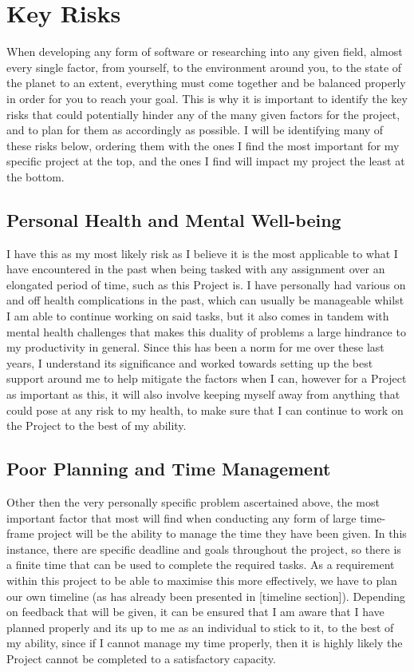 \documentclass{article}
\begin{document}
\section{Key Risks}
When developing any form of software or researching into any given field, almost every single factor, from yourself, to the environment around you, to the state of the planet to an extent, everything must come together and be balanced properly in order for you to reach your goal. This is why it is important to identify the key risks that could potentially hinder any of the many given factors for the project, and to plan for them as accordingly as possible. I will be identifying many of these risks below, ordering them with the ones I find the most important for my specific project at the top, and the ones I find will impact my project the least at the bottom.

\subsection{Personal Health and Mental Well-being}
I have this as my most likely risk as I believe it is the most applicable to what I have encountered in the past when being tasked with any assignment over an elongated period of time, such as this Project is. I have personally had various on and off health complications in the past, which can usually be manageable whilst I am able to continue working on said tasks, but it also comes in tandem with mental health challenges that makes this duality of problems a large hindrance to my productivity in general. Since this has been a norm for me over these last years, I understand its significance and worked towards setting up the best support around me to help mitigate the factors when I can, however for a Project as important as this, it will also involve keeping myself away from anything that could pose at any risk to my health, to make sure that I can continue to work on the Project to the best of my ability.

\subsection{Poor Planning and Time Management}
Other then the very personally specific problem ascertained above, the most important factor that most will find when conducting any form of large time-frame project will be the ability to manage the time they have been given. In this instance, there are specific deadline and goals throughout the project, so there is a finite time that can be used to complete the required tasks. As a requirement within this project to be able to maximise this more effectively, we have to plan our own timeline (as has already been presented in [timeline section]). Depending on feedback that will be given, it can be ensured that I am aware that I have planned properly and its up to me as an individual to stick to it, to the best of my ability, since if I cannot manage my time properly, then it is highly likely the Project cannot be completed to a satisfactory capacity.
\end{document}
